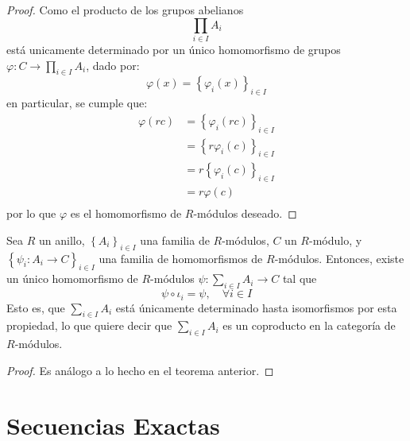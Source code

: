 \documentclass[12pt]{report}
\newcounter{it}
\theoremstyle{largebreak}
\newcommand\cf[3]{\ensuremath{#1:#2\rightarrow#3}}
\begin{document}
    \begin{proof}
        Como el producto de los grupos abelianos
        \begin{equation*}
            \prod_{ i\in I}A_i
        \end{equation*}
        está unicamente determinado por un único homomorfismo de grupos $\cf{\varphi}{C}{\prod_{ i\in I}A_i}$, dado por:
        \begin{equation*}
            \varphi(x)=\left\{\varphi_i(x) \right\}_{i\in I}
        \end{equation*}
        en particular, se cumple que:
        \begin{equation*}
            \begin{split}
                \varphi(rc)&=\left\{\varphi_i(rc) \right\}_{ i\in I}\\
                &=\left\{r\varphi_i(c) \right\}_{ i\in I}\\
                &=r\left\{\varphi_i(c) \right\}_{ i\in I}\\
                &=r\varphi(c)\\
            \end{split}
        \end{equation*}
        por lo que $\varphi$ es el homomorfismo de $R$-módulos deseado.
    \end{proof}

    \begin{theor}
        Sea $R$ un anillo, $\left\{A_i \right\}_{ i\in I}$ una familia de $R$-módulos, $C$ un $R$-módulo, y $\left\{\cf{\psi_i}{A_i}{C} \right\}_{ i\in I}$ una familia de homomorfismos de $R$-módulos. Entonces, existe un único homomorfismo de $R$-módulos $\cf{\psi}{\sum_{ i\in I}A_i}{C}$ tal que
        \begin{equation*}
            \psi\circ\iota_i=\psi,\quad\forall i\in I
        \end{equation*}
        Esto es, que $\sum_{ i\in I}A_i$ está únicamente determinado hasta isomorfismos por esta propiedad, lo que quiere decir que $\sum_{ i\in I}A_i$ es un coproducto en la categoría de $R$-módulos.
    \end{theor}

    \begin{proof}
        Es análogo a lo hecho en el teorema anterior.
    \end{proof}


    \section{Secuencias Exactas}
\end{document}
